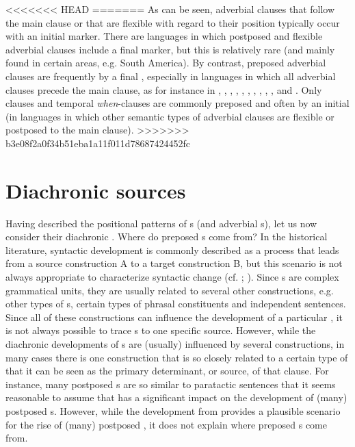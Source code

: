 \documentclass[output=paper]{langsci/langscibook}
\begin{document}
<<<<<<< HEAD
=======
\largerpage
As can be seen, adverbial clauses that follow the main clause or that are flexible with regard to their position typically occur with an initial marker. There are languages in which postposed and flexible adverbial clauses include a final marker, but this is relatively rare (and mainly found in certain areas, e.g. South America). By contrast, preposed adverbial clauses are frequently  by a final , especially in languages in which all adverbial clauses precede the main clause, as for instance in , , , , , , , , , , and . Only  clauses and temporal \textit{when}-clauses are commonly preposed and often  by an initial  (in languages in which other semantic types of adverbial clauses are flexible or postposed to the main clause). 
>>>>>>> b3e08f2a0f34b51eba1a11f011d78687424452fc

\section{Diachronic sources}\label{sec:diessel:3}

Having described the positional patterns of s (and adverbial s), let us now consider their diachronic . Where do preposed s come from? In the historical literature, syntactic development is commonly described as a process that leads from a source construction A to a target construction B, but this scenario is not always appropriate to characterize syntactic change (cf. \citealt{Givón1991};  \citealt{VandeVeldeEtAl2013}). Since s are complex grammatical units, they are usually related to several other constructions, e.g. other types of s, certain types of phrasal constituents and independent sentences. Since all of these constructions can influence the development of a particular , it is not always possible to trace s to one specific source. However, while the diachronic developments of s are (usually) influenced by several constructions, in many cases there is one construction that is so closely related to a certain type of  that it can be seen as the primary determinant, or source, of that clause. For instance, many postposed s are so similar to paratactic sentences that it seems reasonable to assume that  has a significant impact on the development of (many) postposed s. However, while the development from  provides a plausible scenario for the rise of (many) postposed , it does not explain where preposed s come from.
\end{document}
